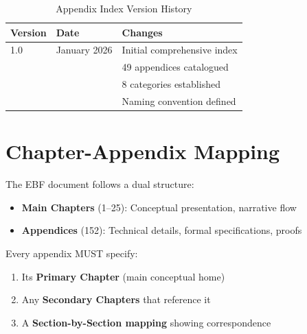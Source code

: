 \begin{table}[htbp]
\centering
\caption{Appendix Index Version History}
\label{tab:index-version}
\renewcommand{\arraystretch}{1.3}
\begin{tabular}{@{}lll@{}}
\toprule
\textbf{Version} & \textbf{Date} & \textbf{Changes} \\
\midrule
1.0 & January 2026 & Initial comprehensive index \\
 & & 49 appendices catalogued \\
 & & 8 categories established \\
 & & Naming convention defined \\
\bottomrule
\end{tabular}
\end{table}

\section{Chapter-Appendix Mapping}
\label{sec:index-chapter-mapping}

\begin{tcolorbox}[colback=purple!5!white, colframe=purple!75!black, 
    title=Critical: Every Appendix Links to Main Chapters]

The EBF document follows a dual structure:
\begin{itemize}[nosep]
\item \textbf{Main Chapters} (1--25): Conceptual presentation, narrative flow
\item \textbf{Appendices} (152): Technical details, formal specifications, proofs
\end{itemize}

Every appendix MUST specify:
\begin{enumerate}[nosep]
\item Its \textbf{Primary Chapter} (main conceptual home)
\item Any \textbf{Secondary Chapters} that reference it
\item A \textbf{Section-by-Section mapping} showing correspondence
\end{enumerate}

\end{tcolorbox}

